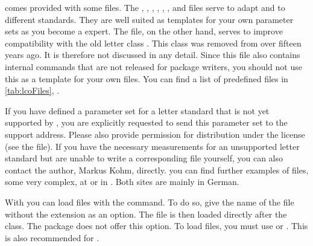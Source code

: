 \KOMAScript{} comes provided with some  files. The ,
, , , ,
, and 
files serve to adapt  and  to different
standards. They are well suited as templates for your own parameter sets as
you become a \KOMAScript{} expert. The  file, on the other
hand, serves to improve compatibility with the old letter class
. This class was removed from \KOMAScript{} over fifteen years
ago. It is therefore not discussed in any detail. Since this file also
contains internal commands that are not released for package writers, you
should not use this as a template for your own  files. You can find
a list of predefined  files in \autoref{tab:lcoFiles},
.

If you have defined a parameter set for a letter standard that is not yet
supported by \KOMAScript{}, you are explicitly requested to send this
parameter set to the \KOMAScript{} support address. Please also provide
permission for distribution under the \KOMAScript{} license (see the
 file). If you have the necessary measurements for an
unsupported letter standard but are unable to write a corresponding 
file yourself, you can also contact the \KOMAScript{} author, Markus Kohm,
directly. you can find further examples of  files, some very
complex, at \cite{homepage} or in \cite{DANTE:TK0203:MJK}. Both sites are
mainly in German.


\begin{Declaration}
\end{Declaration}
With  you can load  files
with the  command. To do so, give the name of the
 file without the extension as an option. The
 file is then loaded directly after the class. The
 package does not offer this option.
To load  files, you must use  or
.
This is also recommended for .

